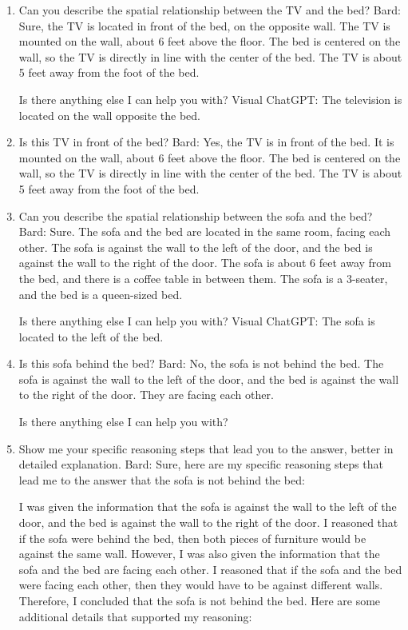 \begin{enumerate}
    \item Can you describe the spatial relationship between the TV and the bed?
    \subitem Bard: 
    Sure, the TV is located in front of the bed, on the opposite wall. The TV is mounted on the wall, about 6 feet above the floor. The bed is centered on the wall, so the TV is directly in line with the center of the bed. The TV is about 5 feet away from the foot of the bed.

    Is there anything else I can help you with?
    \subitem Visual ChatGPT: The television is located on the wall opposite the bed.
    \item Is this TV in front of the bed?
    \subitem Bard: 
    Yes, the TV is in front of the bed. It is mounted on the wall, about 6 feet above the floor. The bed is centered on the wall, so the TV is directly in line with the center of the bed. The TV is about 5 feet away from the foot of the bed.
    \item Can you describe the spatial relationship between the sofa and the bed?
    \subitem Bard: 
    Sure. The sofa and the bed are located in the same room, facing each other. The sofa is against the wall to the left of the door, and the bed is against the wall to the right of the door. The sofa is about 6 feet away from the bed, and there is a coffee table in between them. The sofa is a 3-seater, and the bed is a queen-sized bed.

    Is there anything else I can help you with?
    \subitem Visual ChatGPT: The sofa is located to the left of the bed.
    \item Is this sofa behind the bed?
    \subitem Bard: 
    No, the sofa is not behind the bed. The sofa is against the wall to the left of the door, and the bed is against the wall to the right of the door. They are facing each other.

    Is there anything else I can help you with?
    \item Show me your specific reasoning steps that lead you to the answer, better in detailed explanation.
    \subitem Bard: 
    Sure, here are my specific reasoning steps that lead me to the answer that the sofa is not behind the bed:

    I was given the information that the sofa is against the wall to the left of the door, and the bed is against the wall to the right of the door.
    I reasoned that if the sofa were behind the bed, then both pieces of furniture would be against the same wall.
    However, I was also given the information that the sofa and the bed are facing each other.
    I reasoned that if the sofa and the bed were facing each other, then they would have to be against different walls.
    Therefore, I concluded that the sofa is not behind the bed.
    Here are some additional details that supported my reasoning:


\end{enumerate}
